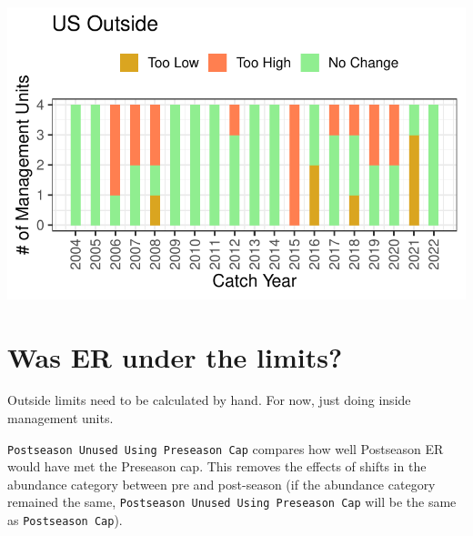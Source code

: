 \documentclass[
  letterpaper,
  DIV=11,
  numbers=noendperiod]{scrartcl}
\begin{document}
\includegraphics{index-5yr_files/figure-pdf/unnamed-chunk-7-1.pdf}

\section{Was ER under the limits?}\label{was-er-under-the-limits}

Outside limits need to be calculated by hand. For now, just doing inside
management units.

\texttt{Postseason\ Unused\ Using\ Preseason\ Cap} compares how well
Postseason ER would have met the Preseason cap. This removes the effects
of shifts in the abundance category between pre and post-season (if the
abundance category remained the same,
\texttt{Postseason\ Unused\ Using\ Preseason\ Cap} will be the same as
\texttt{Postseason\ Cap}).
\end{document}
